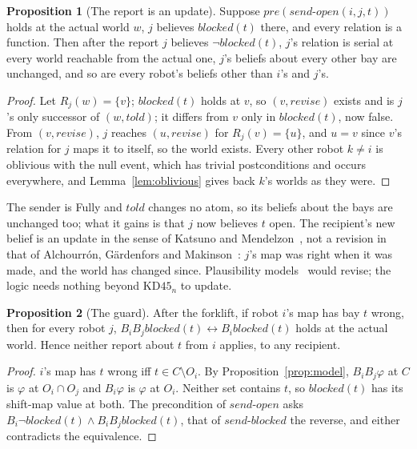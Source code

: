 \documentclass[11pt,a4paper]{article}
\theoremstyle{definition}
\newtheorem{proposition}{Proposition}
\newcommand{\pre}{\mathit{pre}}
\newcommand{\blocked}{\mathit{blocked}}
\newcommand{\Bop}[1]{B_{#1}}
\newcommand{\Obs}{O}
\begin{document}
\begin{proposition}[The report is an update]
\label{prop:update}
Suppose $\pre(\mathit{send\text{-}open}(i,j,t))$ holds at the actual world $w$, $j$
believes $\blocked(t)$ there, and every relation is a function. Then after the
report $j$ believes $\neg\blocked(t)$, $j$'s relation is serial at every world
reachable from the actual one, $j$'s beliefs about every other bay are unchanged,
and so are every robot's beliefs other than $i$'s and $j$'s.
\end{proposition}

\begin{proof}
Let $R_j(w) = \{v\}$; $\blocked(t)$ holds at $v$, so $(v,\mathit{revise})$ exists
and is $j$'s only successor of $(w,\mathit{told})$; it differs from $v$ only in
$\blocked(t)$, now false. From $(v,\mathit{revise})$, $j$ reaches
$(u,\mathit{revise})$ for $R_j(v) = \{u\}$, and $u = v$ since $v$'s relation for
$j$ maps it to itself, so the world exists. Every other robot $k \neq i$ is
oblivious with the null event, which has trivial postconditions and occurs
everywhere, and Lemma~\ref{lem:oblivious} gives back $k$'s worlds as they were.
\end{proof}

\noindent
The sender is Fully and $\mathit{told}$ changes no atom, so its beliefs about the
bays are unchanged too; what it gains is that $j$ now believes $t$ open. The
recipient's new belief is an update in the sense of Katsuno and
Mendelzon~\cite{km1991}, not a revision in that of Alchourr\'on, G\"ardenfors and
Makinson~\cite{agm1985}: $j$'s map was right when it was made, and the world has
changed since. Plausibility models~\cite{bs2008} would revise; the logic needs
nothing beyond $\mathrm{KD45}_n$ to update.

\begin{proposition}[The guard]
\label{prop:guard}
After the forklift, if robot $i$'s map has bay $t$ wrong, then for every robot $j$,
$\Bop{i}\Bop{j}\blocked(t) \leftrightarrow \Bop{i}\blocked(t)$ holds at the actual
world. Hence neither report about $t$ from $i$ applies, to any recipient.
\end{proposition}

\begin{proof}
$i$'s map has $t$ wrong iff $t \in C \setminus \Obs_i$. By
Proposition~\ref{prop:model}, $\Bop{i}\Bop{j}\varphi$ at $C$ is $\varphi$ at
$\Obs_i \cap \Obs_j$ and $\Bop{i}\varphi$ is $\varphi$ at $\Obs_i$. Neither set
contains $t$, so $\blocked(t)$ has its shift-map value at both. The precondition
of $\mathit{send\text{-}open}$ asks $\Bop{i}\neg\blocked(t) \wedge
\Bop{i}\Bop{j}\blocked(t)$, that of $\mathit{send\text{-}blocked}$ the
reverse, and either contradicts the equivalence.
\end{proof}
\end{document}
